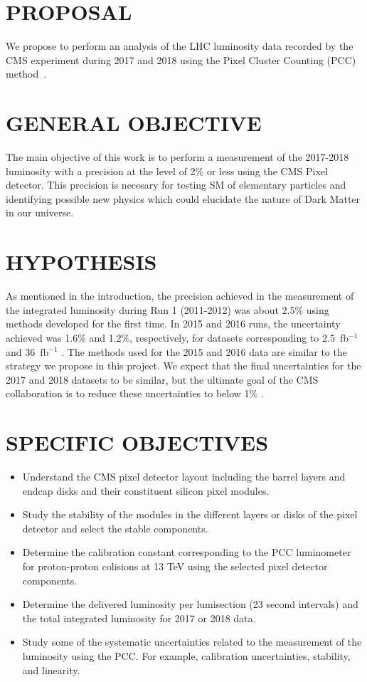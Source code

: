 \documentclass[final,12pt]{article}
\newcommand{\lumi}[1]{{#1~fb$^{-1}$}}
\begin{document}
\section{PROPOSAL}

We propose to perform an analysis of the LHC luminosity data recorded by the CMS experiment during 2017 and 2018 using the Pixel Cluster Counting (PCC) method~\cite{LUM12001}.  

\section{GENERAL OBJECTIVE}

The main objective of this work is to perform a measurement of the 2017-2018 luminosity with a precision at the level of 2\% or less using the CMS Pixel detector.
This precision is necesary for testing SM of elementary particles and identifying possible new physics which could elucidate the nature of Dark Matter in our universe. 


\section{HYPOTHESIS}

As mentioned in the introduction, the precision achieved in the measurement of the integrated luminosity during Run 1 (2011-2012) was about 2.5\% using  methods developed for the first time.
In 2015 and 2016 runs, the uncertainty achieved was 1.6\% and 1.2\%, respectively, for datasets corresponding to \lumi{2.5} and \lumi{36}  \cite{Sirunyan:2021qkt}.
The methods used for the 2015 and 2016 data are similar to the strategy we propose in this project.
We expect that the final uncertainties for the 2017 and 2018 datasets to be similar, but the ultimate goal of the CMS collaboration is to reduce these uncertainties to below 1\%  \cite{Dainese:2019rgk}.


\section{SPECIFIC OBJECTIVES}

\begin{itemize}
\item Understand the CMS pixel detector layout including the barrel layers and endcap disks and their constituent silicon pixel modules.
\item Study the stability of the modules in the different layers or disks of the pixel detector and select the stable components.
\item Determine the calibration constant corresponding to the PCC luminometer for proton-proton colisions at 13 TeV using the selected pixel detector components.
\item Determine the delivered luminosity per lumisection (23 second intervals) and the total integrated luminosity for 2017 or 2018 data.
\item Study some of the systematic uncertainties related to the measurement of the luminosity using the PCC. For example, calibration uncertainties, stability, and linearity.
\end{itemize}
\end{document}
